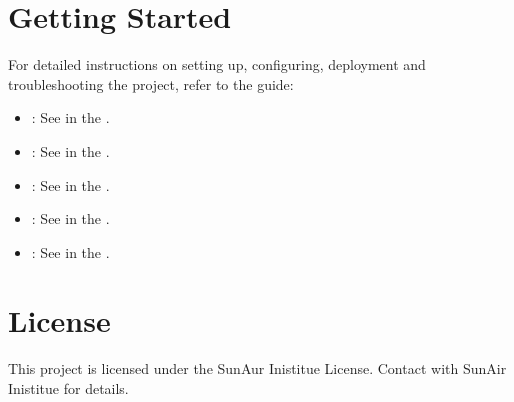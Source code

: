 \documentclass[letterpaper,10pt,english]{sphinxmanual}
\begin{document}
\section{Getting Started}
\label{\detokenize{overview:getting-started}}
\sphinxAtStartPar
For detailed instructions on setting up, configuring, deployment and troubleshooting the project, refer to the  guide:
\begin{itemize}
\item {} 
\sphinxAtStartPar
{}: See {\hyperref[\detokenize{quickstart:prerequisites}]{}} in the {\hyperref[\detokenize{quickstart::doc}]{}}.

\item {} 
\sphinxAtStartPar
{}: See {\hyperref[\detokenize{quickstart:setting-up-environment}]{}} in the {\hyperref[\detokenize{quickstart::doc}]{}}.

\item {} 
\sphinxAtStartPar
{}: See {\hyperref[\detokenize{quickstart:configuration}]{}} in the {\hyperref[\detokenize{quickstart::doc}]{}}.

\item {} 
\sphinxAtStartPar
{}: See {\hyperref[\detokenize{quickstart:deployment}]{}} in the {\hyperref[\detokenize{quickstart::doc}]{}}.

\item {} 
\sphinxAtStartPar
{}: See {\hyperref[\detokenize{quickstart:troubleshooting}]{}} in the {\hyperref[\detokenize{quickstart::doc}]{}}.

\end{itemize}


\section{License}
\label{\detokenize{overview:license}}
\sphinxAtStartPar
This project is licensed under the SunAur Inistitue License. Contact with SunAir Inistitue for details.
\end{document}
